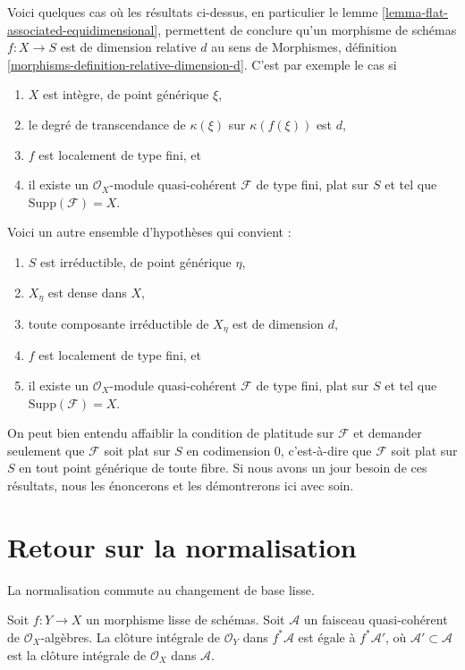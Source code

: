 \begin{remark}
\label{remark-flat-equidimensional}
Voici quelques cas où les résultats ci-dessus, en particulier le
lemme \ref{lemma-flat-associated-equidimensional},
permettent de conclure qu'un morphisme de schémas $f : X \to S$
est de dimension relative $d$ au sens de
Morphismes, définition \ref{morphisms-definition-relative-dimension-d}.
C'est par exemple le cas si
\begin{enumerate}
\item $X$ est intègre, de point générique $\xi$,
\item le degré de transcendance de $\kappa(\xi)$ sur $\kappa(f(\xi))$ est $d$,
\item $f$ est localement de type fini, et
\item il existe un $\mathcal{O}_X$-module quasi-cohérent $\mathcal{F}$
de type fini, plat sur $S$ et tel que $\text{Supp}(\mathcal{F}) = X$.
\end{enumerate}
Voici un autre ensemble d'hypothèses qui convient :
\begin{enumerate}
\item $S$ est irréductible, de point générique $\eta$,
\item $X_\eta$ est dense dans $X$,
\item toute composante irréductible de $X_\eta$ est de dimension $d$,
\item $f$ est localement de type fini, et
\item il existe un $\mathcal{O}_X$-module quasi-cohérent $\mathcal{F}$
de type fini, plat sur $S$ et tel que $\text{Supp}(\mathcal{F}) = X$.
\end{enumerate}
On peut bien entendu affaiblir la condition de platitude sur $\mathcal{F}$
et demander seulement que $\mathcal{F}$ soit plat sur $S$ en codimension $0$,
c'est-à-dire que $\mathcal{F}$ soit plat sur $S$ en tout point générique de
toute fibre. Si nous avons un jour besoin de ces résultats, nous les énoncerons
et les démontrerons ici avec soin.
\end{remark}
\section{Retour sur la normalisation}
\label{section-normalization}

\noindent
La normalisation commute au changement de base lisse.

\begin{lemma}
\label{lemma-integral-closure-smooth-pullback}
Soit $f : Y \to X$ un morphisme lisse de schémas. Soit $\mathcal{A}$ un
faisceau quasi-cohérent de $\mathcal{O}_X$-algèbres. La clôture intégrale
de $\mathcal{O}_Y$ dans $f^*\mathcal{A}$ est égale à $f^*\mathcal{A}'$,
où $\mathcal{A}' \subset \mathcal{A}$ est la clôture intégrale de
$\mathcal{O}_X$ dans $\mathcal{A}$.
\end{lemma}

